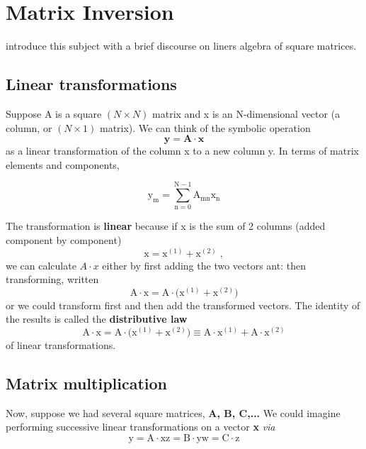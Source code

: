 \section{Matrix Inversion}
 introduce this subject with a brief discourse on liners
algebra of square matrices.

\subsection{Linear transformations}
Suppose A is a square $(N\times N)$ matrix and x is an N-dimensional
vector (a column, or $(N\times 1)$ matrix). We can think of the symbolic
operation
\begin{equation}
    \label{eq:09_26}
    \mathbf{y= A \cdot x}
\end{equation} 
as a linear transformation of the column x to a new column y. In
terms of matrix elements and components,

\begin{equation}
    \label{eq:09_27}
    \mathrm{y_m = \sum_{n=0}^{N-1} A_{mn} x_n}
\end{equation}

The transformation is \textbf{linear} because if x is the sum of 2 columns
(added component by component)
\begin{equation}
    \label{eq:09_28}
    \mathrm{x=x^{(1)}+x^{(2)}\;,}
\end{equation}
we can calculate $A \cdot x$ either by first adding the two vectors ant:
then transforming, written
\begin{equation}
    \label{eq:09_29}
    \mathrm{A \cdot x = A \cdot \Big( x^{(1)}+x^{(2)} \Big)}
\end{equation}
or we could transform first and then add the transformed vectors.
The identity of the results is called the \textbf{distributive law}
\begin{equation}
    \label{eq:09_30}
    \mathrm{A \cdot x = A \cdot \Big( x^{(1)}+x^{(2)} \Big) \equiv   A \cdot x^{(1)}+ A \cdot x^{(2)} }
\end{equation}
of linear transformations.

\subsection{Matrix multiplication}

Now, suppose we had several square matrices, \textbf{A, B, C,...} We
could imagine performing successive linear transformations on a
vector \textbf{x} \textit{via}
\begin{subequations}
    \begin{equation}
        \label{eq:09_31a}
        \mathrm{ y= A \cdot x} %
    \end{equation}
    \begin{equation}
        \label{eq:09_31b}
        \mathrm{ z= B \cdot y} %
    \end{equation}
    \begin{equation}
        \label{eq:09_31c}
        \mathrm{ w = C \cdot z}  %
    \end{equation}
\end{subequations}

